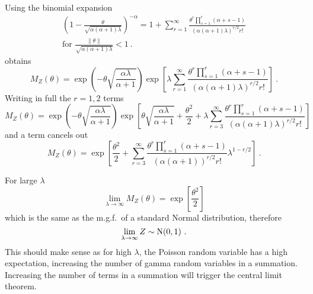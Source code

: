 Using the binomial expansion 
\begin{multline}
  \left(
    1-\frac{\theta}{\sqrt{\alpha(\alpha+1)\lambda}}
  \right)^{-\alpha}
  =
  1+
  \sum_{r=1}^\infty \frac{\theta^r\prod_{s=1}^r(\alpha+s-1)}{(\alpha(\alpha+1)\lambda)^{r/2}r!}
  \\
  \text{for }\frac{\|\theta\|}{\sqrt{\alpha(\alpha+1)\lambda}}<1 \ .
\end{multline}
obtains
\begin{equation}
  M_Z(\theta)=
  \exp\left(
      -\theta\sqrt{\frac{\alpha\lambda}{\alpha+1}}
    \right)
  \exp\left[
    \lambda
    \sum_{r=1}^\infty \frac{\theta^r\prod_{s=1}^r(\alpha+s-1)}{(\alpha(\alpha+1)\lambda)^{r/2}r!}
  \right]
  \ .
\end{equation}
Writing in full the $r=1,2$ terms
\begin{equation*}
  M_Z(\theta)=
  \exp\left(
      -\theta\sqrt{\frac{\alpha\lambda}{\alpha+1}}
    \right)
  \exp\left[
    \theta\sqrt{\frac{\alpha\lambda}{\alpha+1}}
    +\frac{\theta^2}{2}
    +\lambda\sum_{r=3}^\infty \frac{\theta^r\prod_{s=1}^r(\alpha+s-1)}{(\alpha(\alpha+1)\lambda)^{r/2}r!}
  \right]
\end{equation*}
and a term cancels out
\begin{equation}
  M_Z(\theta)=
  \exp\left[
    \frac{\theta^2}{2}
    +\sum_{r=3}^\infty
    \frac
      {\theta^r\prod_{s=1}^r(\alpha+s-1)}
      {(\alpha(\alpha+1))^{r/2}r!}
    \lambda^{1-r/2}
  \right]
  \ .
\end{equation}

For large $\lambda$
\begin{equation}
  \lim_{\lambda\rightarrow\infty}M_Z(\theta)=\exp\left[\frac{\theta^2}{2}\right]
\end{equation}
which is the same as the m.g.f.~of a standard Normal distribution, therefore
\begin{equation}
  \lim_{\lambda\rightarrow\infty}Z\sim\operatorname{N}(0,1) \ .
\end{equation}
This should make sense as for high $\lambda$, the Poisson random variable has a high expectation, increasing the number of gamma random variables in a summation. Increasing the number of terms in a summation will trigger the central limit theorem.

